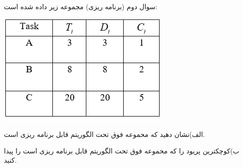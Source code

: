 \documentclass[12pt]{article}
\begin{document}
    \begin{problem}{سوال دوم}
    	(برنامه ریزی) مجموعه 
    	زیر داده شده است:
    	
    	\centering
    	\includegraphics[scale=1]{Resources/2.png}
    	
    	\raggedright
    	الف)نشان دهید که محموعه 
    	فوق تحت الگوریتم
    	قابل برنامه ریزی است.
    	
    	ب)کوچکترین پریود 
    	را که محموعه 
    	فوق تحت الگوریتم 
    	قابل برنامه ریزی است را پیدا کنید. 
    
    \end{problem}
    
\end{document}
